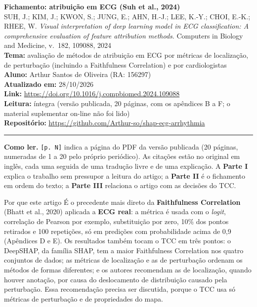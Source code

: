 \documentclass[11pt,a4paper]{article}
\begin{document}
\begin{center}
    {\LARGE \textbf{Fichamento: atribuição em ECG (Suh et al., 2024)}} \\[0.35em]
    {\large SUH, J.; KIM, J.; KWON, S.; JUNG, E.; AHN, H.-J.; LEE, K.-Y.; CHOI, E.-K.; RHEE, W. \textit{Visual interpretation of deep learning model in ECG classification: A comprehensive evaluation of feature attribution methods}. Computers in Biology and Medicine, v.~182, 109088, 2024} \\[0.3em]
    \textbf{Tema:} avaliação de métodos de atribuição em ECG por métricas de localização, de perturbação (incluindo a Faithfulness Correlation) e por cardiologistas \\[0.2em]
    \textbf{Aluno:} Arthur Santos de Oliveira (RA: 156297) \\[0.2em]
    \textbf{Atualizado em:} 28/10/2026 \\[0.2em]
    \textbf{Link:} \url{https://doi.org/10.1016/j.compbiomed.2024.109088} \\[0.2em]
    \textbf{Leitura:} íntegra (versão publicada, 20 páginas, com os apêndices B a F; o material suplementar on-line não foi lido) \\[0.2em]
    \textbf{Repositório:} \url{https://github.com/Arthur-so/shap-ecg-arrhythmia}
\end{center}
\vspace{-0.5em}
\hrule
\vspace{0.8em}

\textbf{Como ler.} \texttt{[p. N]} indica a página do PDF da versão publicada (20 páginas, numeradas de 1 a 20 pelo próprio periódico). As citações estão no original em inglês, cada uma seguida de uma tradução livre e de uma explicação. A \textbf{Parte I} explica o trabalho sem pressupor a leitura do artigo; a \textbf{Parte II} é o fichamento em ordem do texto; a \textbf{Parte III} relaciona o artigo com as decisões do TCC.

\begin{infobox}[note]{Por que este artigo}
É o precedente mais direto da \textbf{Faithfulness Correlation} (Bhatt et al., 2020) aplicada a \textbf{ECG real}: a métrica é usada com o \textit{logit}, correlação de Pearson por exemplo, substituição por zero, 10\% dos pontos retirados e 100 repetições, só em predições com probabilidade acima de 0,9 (Apêndices D e E). Os resultados também tocam o TCC em três pontos: o DeepSHAP, da família SHAP, tem a maior Faithfulness Correlation nos quatro conjuntos de dados; as métricas de localização e as de perturbação ordenam os métodos de formas diferentes; e os autores recomendam as de localização, quando houver anotação, por causa do deslocamento de distribuição causado pela perturbação. Essa recomendação precisa ser discutida, porque o TCC usa só métricas de perturbação e de propriedades do mapa.
\end{infobox}
\end{document}
